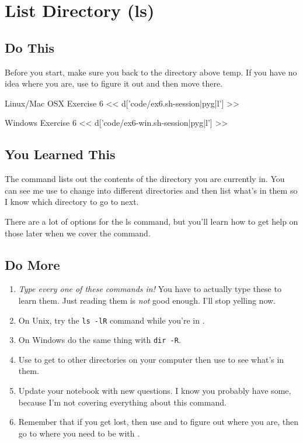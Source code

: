 \chapter{List Directory (ls)}

\section{Do This}

Before you start, make sure you  back to the directory above temp.
If you have no idea where you are, use  to figure it out and then
move there.

\begin{code}{Linux/Mac OSX Exercise 6}
<< d['code/ex6.sh-session|pyg|l'] >>
\end{code}

\begin{code}{Windows Exercise 6}
<< d['code/ex6-win.sh-session|pyg|l'] >>
\end{code}

\section{You Learned This}

The  command lists out the contents of the directory you
are currently in.  You can see me use  to change into different
directories and then list what's in them so I know which directory to go to next.

There are a lot of options for the ls command, but you'll learn how to get
help on those later when we cover the  command.

\section{Do More}

\begin{enumerate}
\item \emph{Type every one of these commands in!} You have to actually type these
    to learn them.  Just reading them is \emph{not} good enough.  I'll stop yelling
    now.
\item On Unix, try the \verb|ls -lR| command while you're in .
\item On Windows do the same thing with \verb|dir -R|.
\item Use  to get to other directories on your computer then use  to see what's in them.
\item Update your notebook with new questions.  I know you probably have some, because I'm
    not covering everything about this command.
\item Remember that if you get lost, then use  and  to figure out where you are, then go to where you need to be with .
\end{enumerate}

